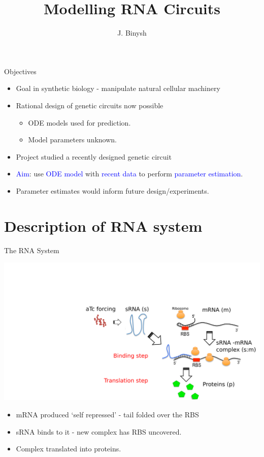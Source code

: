 \documentclass{beamer}
\title %
{Modelling RNA Circuits}
\subtitle
{}
\author %
{J. Binysh\inst{1}}
\institute[University of Warwick] %
{
  \inst{1}%
 	Centre for Complexity Science\\
  University of Warwick
 }
\begin{document}
\begin{frame}
  \titlepage
\end{frame}


\begin{frame}{Objectives}{}
  \begin{itemize}
  \item Goal in synthetic biology - manipulate natural cellular machinery
    \item  Rational design of genetic circuits now possible
      \begin{itemize}
      \item ODE models used for prediction.
      \item Model parameters unknown.
      \end{itemize}
    \item Project studied a recently designed genetic circuit 
    \item \textcolor{blue}{Aim}: use \textcolor{blue}{ODE model} with \textcolor{blue}{recent data} to perform \textcolor{blue}{parameter estimation}.
    \item Parameter estimates would inform future design/experiments.
        \end{itemize}
\end{frame}

\section{Description of RNA system}

\begin{frame}{The RNA System}{}
  \begin{center}
  \includegraphics[trim = 370 0 0 200,clip = true,scale = 0.4]{Figures/schematic_initial_with_forcing.png}
  \end{center}

  \begin{itemize}
    \item  mRNA produced `self repressed'  - tail folded over the RBS
    \item  sRNA binds to it - new complex has RBS uncovered.
    \item Complex translated into proteins.
    \end{itemize}
\end{frame}
\end{document}
